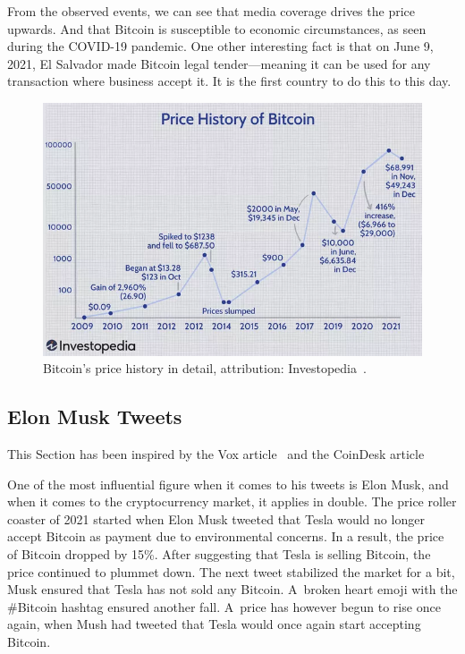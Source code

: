From the observed events, we can see that media coverage drives the price upwards. And that Bitcoin is susceptible to economic circumstances, as seen during the COVID-19 pandemic. One other interesting fact is that on June 9, 2021, El Salvador made Bitcoin legal tender---meaning it can be used for any transaction where business accept it. It is the first country to do this to this day.

\begin{figure}[!t]
    \centering
    \includegraphics[width=\columnwidth]{figures/investopedia-bitcoin-price-history.png}
    \caption{Bitcoin's price history in detail, attribution: Investopedia~\cite{investopedia:bitcoin-price-history}.}
    \label{figure-investopedia-btc-history}
\end{figure}

\subsection*{Elon Musk Tweets}
This Section has been inspired by the Vox article~\cite{vox:elon} and the CoinDesk article~\cite{coindesk:elon}

One of the most influential figure when it comes to his tweets is Elon Musk, and when it comes to the cryptocurrency market, it applies in double. The price roller coaster of 2021 started when Elon Musk tweeted that Tesla would no longer accept Bitcoin as payment due to environmental concerns. In a result, the price of Bitcoin dropped by 15\%. After suggesting that Tesla is selling Bitcoin, the price continued to plummet down. The next tweet stabilized the market for a bit, Musk ensured that Tesla has not sold any Bitcoin. A~broken heart emoji with the \#Bitcoin hashtag ensured another fall. A~price has however begun to rise once again, when Mush had tweeted that Tesla would once again start accepting Bitcoin.

